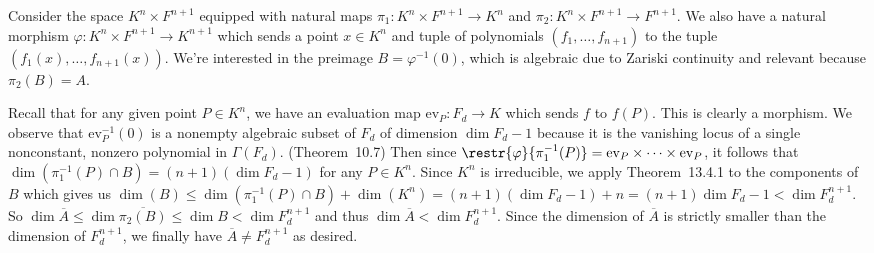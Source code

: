 \documentclass[11pt,letterpaper]{article}
\begin{document}
\begin{solution}
    Consider the space $K^n\times F^{n+1}$ equipped with natural maps $\pi_{1} : K^n\times F^{n+1} \to K^n$ and $\pi_{2} : K^n \times F^{n+1} \to F^{n+1}$. We also have a natural morphism $\varphi : K^n\times F^{n+1} \to K^{n+1}$ which sends a point $x\in K^n$ and tuple of polynomials $(f_1,\ldots,f_{n+1})$ to the tuple $(f_1(x), \ldots, f_{n+1}(x))$. We're interested in the preimage $B=\varphi^{-1}(0)$, which is algebraic due to Zariski continuity and relevant because $\pi_2(B)=A$.

    Recall that for any given point $P\in K^n$, we have an evaluation map $\textrm{ev}_P : F_d \to K$ which sends $f$ to $f(P)$. This is clearly a morphism. We observe that $\textrm{ev}_P^{-1}(0)$ is a nonempty algebraic subset of $F_d$ of dimension $\dim F_d - 1$ because it is the vanishing locus of a single nonconstant, nonzero polynomial in $\Gamma(F_d)$. (Theorem~10.7) Then since $\restr{\varphi}{\pi_1^{-1}(P)} = \textrm{ev}_P\times \cdots \times \textrm{ev}_P$, it follows that $\dim(\pi_1^{-1}(P)\cap B)=(n+1)(\dim F_d - 1)$ for any $P\in K^n$. Since $K^n$ is irreducible, we apply Theorem~13.4.1 to the components of $B$ which gives us $\dim(B)\leq \dim(\pi_1^{-1}(P)\cap B) + \dim(K^n)=  (n+1)(\dim F_d -1) + n =(n+1)\dim F_d - 1 < \dim F_d^{n+1}$. So $\dim \overline{A} \leq \dim \overline{\pi_2(B)} \leq \dim B < \dim F_d^{n+1}$ and thus $\dim \overline{A} < \dim F_d^{n+1}$.
    Since the dimension of $\overline{A}$ is strictly smaller than the dimension of $F_d^{n+1}$, we finally have $\overline{A} \neq F_d^{n+1}$ as desired.
\end{solution}
\end{document}
